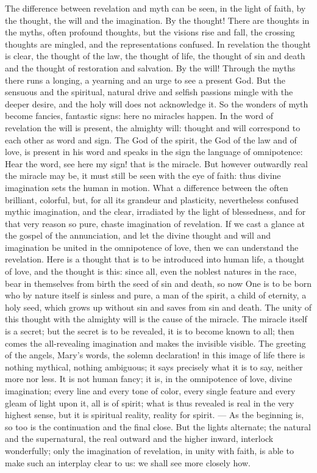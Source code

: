 \documentclass[12pt,a4paper,openany]{book}
\newcommand{\opage}[1]{\marginnote{\footnotesize\textit{[#1]}}}
\begin{document}
The difference between revelation and myth can be seen, in the light of faith, by the thought, the will and the imagination. By the thought! There are thoughts in the myths, often profound thoughts, but the visions rise and fall, the crossing thoughts are mingled, and the representations confused. In revelation the thought is clear, the thought of the law, the thought of life, the thought of sin and death and the thought of restoration and salvation. By the will! Through the myths there runs a longing, a yearning and an urge to see a present God. But the sensuous and the spiritual, natural drive and selfish passions mingle with the deeper desire, and the holy will does not acknowledge it. So the wonders of myth become fancies, fantastic signs: here no miracles happen. In the word of revelation the will is present, the almighty will: thought and will correspond to each other as word and sign. The God of the spirit, the God of the law and of love, is present in his word and speaks in the sign the language of omnipotence: Hear the word, see here my sign! that is the miracle. But however outwardly real the miracle may be, it must still be seen with the eye of faith: thus divine imagination sets the human in motion. What a difference between the often brilliant, colorful, but, for all its grandeur and plasticity, nevertheless confused mythic imagination, and the clear, irradiated by the light of blessedness, and for that very reason so pure,
\setcounter{footnote}{0}%
\opage{42}chaste imagination of revelation. If we cast a glance at the gospel of the annunciation, and let the divine thought and will and imagination be united in the omnipotence of love, then we can understand the revelation. Here is a thought that is to be introduced into human life, a thought of love, and the thought is this: since all, even the noblest natures in the race, bear in themselves from birth the seed of sin and death, so now One is to be born who by nature itself is sinless and pure, a man of the spirit, a child of eternity, a holy seed, which grows up without sin and saves from sin and death. The unity of this thought with the almighty will is the cause of the miracle. The miracle itself is a secret; but the secret is to be revealed, it is to become known to all; then comes the all-revealing imagination and makes the invisible visible. The greeting of the angels, Mary's words, the solemn declaration! in this image of life there is nothing mythical, nothing ambiguous; it says precisely what it is to say, neither more nor less. It is not human fancy; it is, in the omnipotence of love, divine imagination; every line and every tone of color, every single feature and every gleam of light upon it, all is of spirit; what is thus revealed is real in the very highest sense, but it is spiritual reality, reality for spirit. --- As the beginning is, so too is the continuation and the final close. But the lights alternate; the natural and the supernatural, the real outward and the higher inward, interlock wonderfully; only the imagination of revelation, in unity with faith, is able to make such an interplay clear to us: we shall see more closely how.
\end{document}
